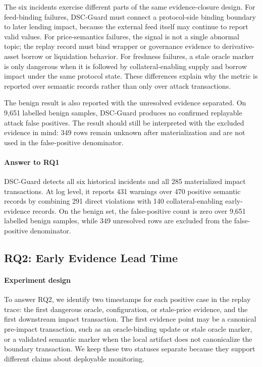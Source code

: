 \documentclass[final,5p]{elsarticle}
\newcommand{\tool}{DSC-Guard\xspace}
\begin{document}
The six incidents exercise different parts of the same evidence-closure design.
For feed-binding failures, \tool must connect a protocol-side binding boundary to later lending impact, because the external feed itself may continue to report valid values.
For price-semantics failures, the signal is not a single abnormal topic; the replay record must bind wrapper or governance evidence to derivative-asset borrow or liquidation behavior.
For freshness failures, a stale oracle marker is only dangerous when it is followed by collateral-enabling supply and borrow impact under the same protocol state.
These differences explain why the metric is reported over semantic records rather than only over attack transactions.

The benign result is also reported with the unresolved evidence separated.
On 9,651 labelled benign samples, \tool produces no confirmed replayable attack false positives.
The result should still be interpreted with the excluded evidence in mind: 349 rows remain unknown after materialization and are not used in the false-positive denominator.

\paragraph{Answer to RQ1}
\tool detects all six historical incidents and all 285 materialized impact transactions.
At log level, it reports 431 warnings over 470 positive semantic records by combining 291 direct violations with 140 collateral-enabling early-evidence records.
On the benign set, the false-positive count is zero over 9,651 labelled benign samples, while 349 unresolved rows are excluded from the false-positive denominator.

\subsection{RQ2: Early Evidence Lead Time}

\paragraph{Experiment design}
To answer RQ2, we identify two timestamps for each positive case in the replay trace: the first dangerous oracle, configuration, or stale-price evidence, and the first downstream impact transaction.
The first evidence point may be a canonical pre-impact transaction, such as an oracle-binding update or stale oracle marker, or a validated semantic marker when the local artifact does not canonicalize the boundary transaction.
We keep these two statuses separate because they support different claims about deployable monitoring.
\end{document}
